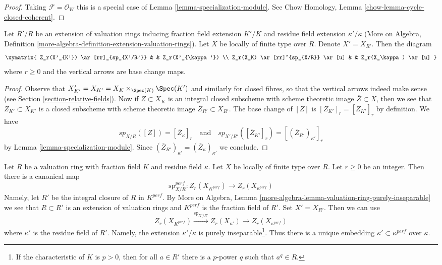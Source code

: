\begin{proof}
Taking $\mathcal{F} = \mathcal{O}_W$ this is a special case of
Lemma \ref{lemma-specialization-module}. See
Chow Homology, Lemma \ref{chow-lemma-cycle-closed-coherent}.
\end{proof}

\begin{lemma}
\label{lemma-specialization-extension}
Let $R'/R$ be an extension of valuation rings inducing fraction field
extension $K'/K$ and residue field extension $\kappa'/\kappa$
(More on Algebra, Definition
\ref{more-algebra-definition-extension-valuation-rings}).
Let $X$ be locally of finite type over $R$. Denote $X' = X_{R'}$.
Then the diagram
$$
\xymatrix{
Z_r(X'_{K'}) \ar[rr]_{sp_{X'/R'}} & & Z_r(X'_{\kappa'}) \\
Z_r(X_K) \ar[rr]^{sp_{X/R}} \ar[u] & & Z_r(X_\kappa) \ar[u]
}
$$
where $r \geq 0$ and the vertical arrows are base change maps.
\end{lemma}

\begin{proof}
Observe that $X'_{K'} = X_{K'} = X_K \times_{\Spec(K)} \Spec(K')$
and similarly for closed fibres, so that the vertical arrows indeed
make sense (see Section \ref{section-relative-fields}).
Now if $Z \subset X_K$ is an integral closed subscheme with
scheme theoretic image $\overline{Z} \subset X$, then we see that
$Z_{K'} \subset X_{K'}$ is a closed subscheme with scheme theoretic
image $\overline{Z}_{R'} \subset X_{R'}$. The base change of
$[Z]$ is $[Z_{K'}]_r = [\overline{Z}_{K'}]_r$ by definition. We have
$$
sp_{X/R}([Z]) = [\overline{Z}_\kappa]_r
\quad\text{and}\quad
sp_{X'/R'}([\overline{Z}_{K'}]_r) = [(\overline{Z}_{R'})_{\kappa'}]_r
$$
by Lemma \ref{lemma-specialization-module}. Since
$(\overline{Z}_{R'})_{\kappa'} = (\overline{Z}_\kappa)_{\kappa'}$
we conclude.
\end{proof}

\begin{remark}
\label{remark-specialization-perfect}
Let $R$ be a valuation ring with fraction field $K$ and residue field $\kappa$.
Let $X$ be locally of finite type over $R$. Let $r \geq 0$ be an integer.
Then there is a canonical map
$$
\text{sp}_{X/R}^{perf} :
Z_r(X_{K^{perf}})
\longrightarrow
Z_r(X_{\kappa^{perf}})
$$
Namely, let $R'$ be the integral closure of $R$ in $K^{perf}$.
By More on Algebra, Lemma
\ref{more-algebra-lemma-valuation-ring-purely-inseparable}
we see that $R \subset R'$ is an extension of valuation rings and
$K^{perf}$ is the fraction field of $R'$. Set $X' = X_{R'}$.
Then we can use
$$
Z_r(X_{K^{perf}})
\xrightarrow{\text{sp}_{X'/R'}}
Z_r(X_{\kappa'})
\to
Z_r(X_{\kappa^{perf}})
$$
where $\kappa'$ is the residue field of $R'$.
Namely, the extension $\kappa'/\kappa$
is purely inseparable\footnote{If the characteristic
of $K$ is $p > 0$, then for all $a \in R'$ there is
a $p$-power $q$ such that $a^q \in R$.}. Thus there is a unique
embedding $\kappa' \subset \kappa^{perf}$ over $\kappa$.
\end{remark}

